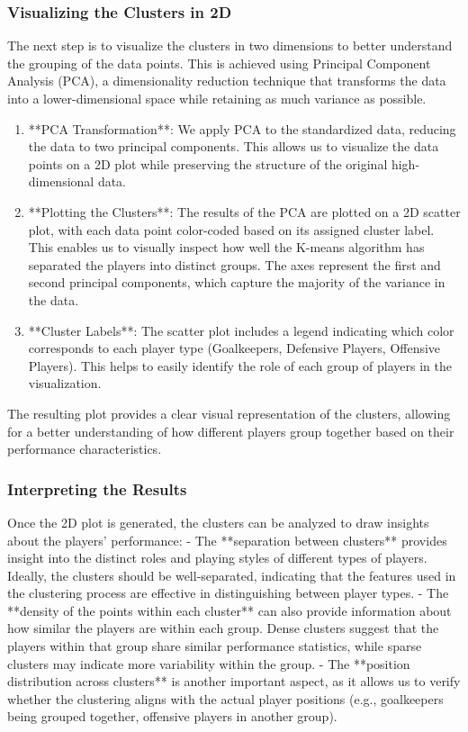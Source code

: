 \documentclass[a4paper,12pt]{article}
\begin{document}
\subsubsection{Visualizing the Clusters in 2D}

The next step is to visualize the clusters in two dimensions to better understand the grouping of the data points. This is achieved using Principal Component Analysis (PCA), a dimensionality reduction technique that transforms the data into a lower-dimensional space while retaining as much variance as possible.

\begin{enumerate}
    \item **PCA Transformation**: We apply PCA to the standardized data, reducing the data to two principal components. This allows us to visualize the data points on a 2D plot while preserving the structure of the original high-dimensional data.
    \item **Plotting the Clusters**: The results of the PCA are plotted on a 2D scatter plot, with each data point color-coded based on its assigned cluster label. This enables us to visually inspect how well the K-means algorithm has separated the players into distinct groups. The axes represent the first and second principal components, which capture the majority of the variance in the data.
    \item **Cluster Labels**: The scatter plot includes a legend indicating which color corresponds to each player type (Goalkeepers, Defensive Players, Offensive Players). This helps to easily identify the role of each group of players in the visualization.
\end{enumerate}

The resulting plot provides a clear visual representation of the clusters, allowing for a better understanding of how different players group together based on their performance characteristics.

\subsubsection{Interpreting the Results}

Once the 2D plot is generated, the clusters can be analyzed to draw insights about the players' performance:
- The **separation between clusters** provides insight into the distinct roles and playing styles of different types of players. Ideally, the clusters should be well-separated, indicating that the features used in the clustering process are effective in distinguishing between player types.
- The **density of the points within each cluster** can also provide information about how similar the players are within each group. Dense clusters suggest that the players within that group share similar performance statistics, while sparse clusters may indicate more variability within the group.
- The **position distribution across clusters** is another important aspect, as it allows us to verify whether the clustering aligns with the actual player positions (e.g., goalkeepers being grouped together, offensive players in another group).
\end{document}
